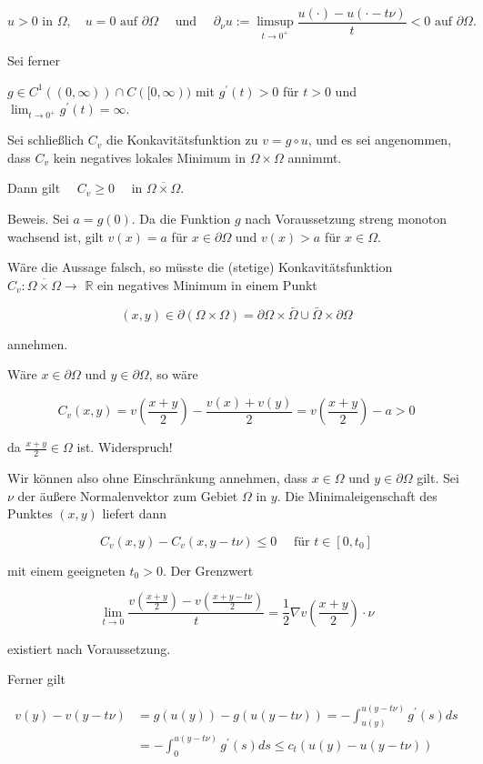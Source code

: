 \documentclass[10pt, letterpaper]{article}
\begin{document}
$$
u>0 \text { in } \Omega, \quad u=0 \text { auf } \partial \Omega \quad \text { und } \quad \partial_{\nu} u:=\limsup _{t \rightarrow 0^{+}} \frac{u(\cdot)-u(\cdot-t \nu)}{t}<0 \text { auf } \partial \Omega \text {. }
$$

Sei ferner

$g \in C^{1}((0, \infty)) \cap C([0, \infty))$ mit $g^{\prime}(t)>0$ für $t>0$ und $\lim _{t \rightarrow 0^{+}} g^{\prime}(t)=\infty$.

Sei schließlich $C_{v}$ die Konkavitätsfunktion zu $v=g \circ u$, und es sei angenommen, dass $C_{v}$ kein negatives lokales Minimum in $\Omega \times \Omega$ annimmt.

Dann gilt $\quad C_{v} \geq 0 \quad$ in $\overline{\Omega \times \Omega}$.

Beweis. Sei $a=g(0)$. Da die Funktion $g$ nach Voraussetzung streng monoton wachsend ist, gilt $v(x)=a$ für $x \in \partial \Omega$ und $v(x)>a$ für $x \in \Omega$.

Wäre die Aussage falsch, so müsste die (stetige) Konkavitätsfunktion $C_{v}: \overline{\Omega \times \Omega} \rightarrow$ $\mathbb{R}$ ein negatives Minimum in einem Punkt

$$
(x, y) \in \partial(\Omega \times \Omega)=\partial \Omega \times \bar{\Omega} \cup \bar{\Omega} \times \partial \Omega
$$

annehmen.

Wäre $x \in \partial \Omega$ und $y \in \partial \Omega$, so wäre

$$
C_{v}(x, y)=v\left(\frac{x+y}{2}\right)-\frac{v(x)+v(y)}{2}=v\left(\frac{x+y}{2}\right)-a>0
$$

da $\frac{x+y}{2} \in \Omega$ ist. Widerspruch!

Wir können also ohne Einschränkung annehmen, dass $x \in \Omega$ und $y \in \partial \Omega$ gilt. Sei $\nu$ der äußere Normalenvektor zum Gebiet $\Omega$ in $y$. Die Minimaleigenschaft des Punktes $(x, y)$ liefert dann

$$
C_{v}(x, y)-C_{v}(x, y-t \nu) \leq 0 \quad \text { für } t \in\left[0, t_{0}\right]
$$

mit einem geeigneten $t_{0}>0$. Der Grenzwert

$$
\lim _{t \rightarrow 0} \frac{v\left(\frac{x+y}{2}\right)-v\left(\frac{x+y-t \nu}{2}\right)}{t}=\frac{1}{2} \nabla v\left(\frac{x+y}{2}\right) \cdot \nu
$$

existiert nach Voraussetzung.

Ferner gilt

$$
\begin{aligned}
v(y)-v(y-t \nu) & =g(u(y))-g(u(y-t \nu))=-\int_{u(y)}^{u(y-t \nu)} g^{\prime}(s) d s \\
& =-\int_{0}^{u(y-t \nu)} g^{\prime}(s) d s \leq c_{t}(u(y)-u(y-t \nu))
\end{aligned}
$$
\end{document}
